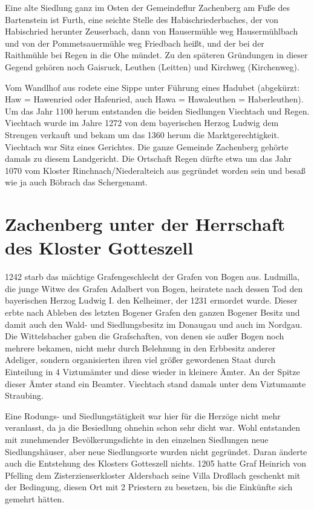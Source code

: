\documentclass{book}
\begin{document}
Eine alte Siedlung ganz im Osten der Gemeindeflur Zachenberg am Fuße des
Bartenstein ist Furth, eine seichte Stelle des Habischriederbaches, der von
Habischried herunter Zeuserbach, dann von Hausermühle weg Hausermühlbach und von
der Pommetsauermühle weg Friedbach heißt, und der bei der Raithmühle bei Regen
in die Ohe mündet. Zu den späteren Gründungen in dieser Gegend gehören noch
Gaisruck, Leuthen (Leitten) und Kirchweg (Kirchenweg).

Vom Wandlhof aus rodete eine Sippe unter Führung eines Hadubet (abgekürzt: Haw =
Hawenried oder Hafenried, auch Hawa = Hawaleuthen = Haberleuthen). Um das Jahr
1100 herum entstanden die beiden Siedlungen Viechtach und Regen. Viechtach wurde
im Jahre 1272 von dem bayerischen Herzog Ludwig dem Strengen verkauft und bekam
um das 1360 herum die Marktgerechtigkeit. Viechtach war Sitz eines Gerichtes.
Die ganze Gemeinde Zachenberg gehörte damals zu diesem Landgericht. Die
Ortschaft Regen dürfte etwa um das Jahr 1070 vom Kloster Rinchnach/Niederalteich
aus gegründet worden sein und besaß wie ja auch Böbrach das Schergenamt.

\section{Zachenberg unter der Herrschaft des Kloster Gotteszell}

1242 starb das mächtige Grafengeschlecht der Grafen von Bogen aus. Ludmilla, die
junge Witwe des Grafen Adalbert von Bogen, heiratete nach dessen Tod den
bayerischen Herzog Ludwig I. den Kelheimer, der 1231 ermordet wurde. Dieser
erbte nach Ableben des letzten Bogener Grafen den ganzen Bogener Besitz und
damit auch den Wald- und Siedlungsbesitz im Donaugau und auch im Nordgau. Die
Wittelsbacher gaben die Grafschaften, von denen sie außer Bogen noch mehrere
bekamen, nicht mehr durch Belehnung in den Erbbesitz anderer Adeliger, sondern
organisierten ihren viel größer gewordenen Staat durch Einteilung in 4
Viztumämter und diese wieder in kleinere Ämter. An der Spitze dieser Ämter stand
ein Beamter. Viechtach stand damals unter dem Viztumamte Straubing.

Eine Rodungs- und Siedlungstätigkeit war hier für die Herzöge nicht mehr
veranlasst, da ja die Besiedlung ohnehin schon sehr dicht war. Wohl entstanden
mit zunehmender Bevölkerungsdichte in den einzelnen Siedlungen neue
Siedlungshäuser, aber neue Siedlungsorte wurden nicht gegründet. Daran änderte
auch die Entstehung des Klosters Gotteszell nichts. 1205 hatte Graf Heinrich von
Pfelling dem Zisterzienserkloster Aldersbach seine Villa Droßlach geschenkt mit
der Bedingung, diesen Ort mit 2 Priestern zu besetzen, bis die Einkünfte sich
gemehrt hätten.
\end{document}
